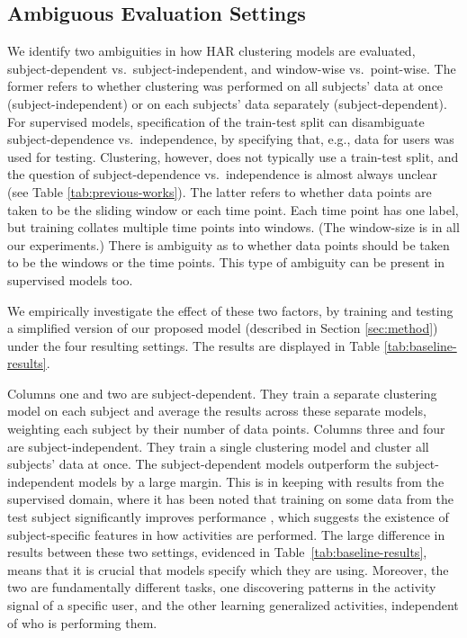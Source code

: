 \documentclass[wcp]{jmlr}
\begin{document}
\subsection{Ambiguous Evaluation Settings} \label{subsec:ambiguous-eval}
We identify two ambiguities in how HAR clustering models are evaluated, subject-dependent vs.\ subject-independent, and window-wise vs.\ point-wise. The former refers to whether clustering was performed on all subjects' data at once (subject-independent) or on each subjects' data separately (subject-dependent). For supervised models, specification of the train-test split can disambiguate subject-dependence vs.\ independence, by specifying that, e.g., data for users  was used for testing. Clustering, however, does not typically use a train-test split, and the question of subject-dependence vs.\ independence is almost always unclear (see Table \ref{tab:previous-works}). The latter refers to whether data points are taken to be the sliding window or each time point. Each time point has one label, but training collates multiple time points into windows. (The window-size is  in all our experiments.) There is ambiguity as to whether data points should be taken to be the windows or the time points. This type of ambiguity can be present in supervised models too.


We empirically investigate the effect of these two factors, by training and testing a simplified version of our proposed model (described in Section \ref{sec:method}) under the four resulting settings.  The results are displayed in Table \ref{tab:baseline-results}. 


Columns one and two are subject-dependent. They train a separate clustering model on each subject and average the results across these separate models, weighting each subject by their number of data points. Columns three and four are subject-independent. They train a single clustering model and cluster all subjects' data at once. The subject-dependent models outperform the subject-independent models by a large margin. This is in keeping with results from the supervised domain, where it has been noted that training on some data from the test subject significantly improves performance \citep{reiss2012introducing,suh2021adversarial}, which suggests the existence of subject-specific features in how activities are performed.  The large difference in results between these two settings, evidenced in \mbox{Table \ref{tab:baseline-results}}, means that it is crucial that models specify which they are using. Moreover, the two are fundamentally different tasks, one discovering patterns in the activity signal of a specific user, and the other learning generalized activities, independent of who is performing them. 
\end{document}
